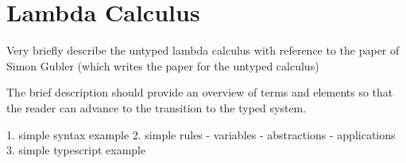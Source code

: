 \section{Lambda Calculus}

Very briefly describe the untyped lambda calculus
with reference to the paper of Simon Gubler
(which writes the paper for the untyped calculus)

The brief description should provide an overview of
terms and elements so that the reader can advance
to the transition to the typed system.

1. simple syntax example
2. simple rules
- variables
- abstractions
- applications
3. simple typescript example \cite{lambdaCalcInTS}